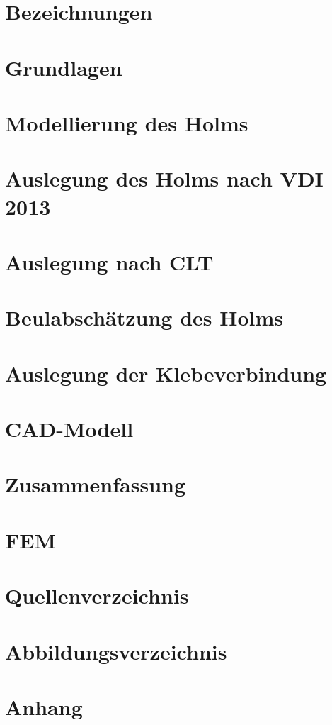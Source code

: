 \documentclass[a4paper,twoside,11pt]{article}
\begin{document}

\newpage

\newpage

\newpage
\tableofcontents
\newpage
\section{Bezeichnungen}

\newpage
\section{Grundlagen}

\newpage
\section{Modellierung des Holms}

\newpage
\section{Auslegung des Holms nach VDI 2013}

\newpage
\section{Auslegung nach CLT}

\newpage
\section{Beulabschätzung des Holms}

\newpage
\section{Auslegung der Klebeverbindung}

\newpage
\section{CAD-Modell}

\newpage
\section{Zusammenfassung}

\newpage
\section{FEM}

\newpage
\section{Quellenverzeichnis}

\newpage
\section{Abbildungsverzeichnis}

\newpage
\section{Anhang}

\end{document}
